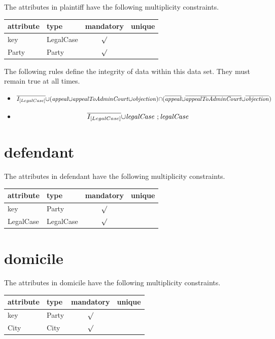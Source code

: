 \documentclass[10pt,a4paper]{report}              %
\theoremstyle{plain}\theorembodyfont{\rmfamily}\newtheorem{definition}{Definition}[section]
\theoremstyle{plain}\theorembodyfont{\rmfamily}\newtheorem{designrule}[definition]{Requirement}
\def\id#1{\mbox{\em #1\/}}
\newcommand{\cmpl}[1]{\overline{#1}}
\begin{document}
\label{sct:plug plaintiff}

The attributes in plaintiff have the following multiplicity constraints. 

\begin{center}
\begin{tabular}{llcc}
attribute & type & mandatory & unique\\
\hline
key  & LegalCase & $\surd$ & \\
Party & Party & $\surd$ & \\
\end{tabular}
\end{center}

The following rules define the integrity of data within this data set. They must remain true at all times. 

\begin{itemize}
\item
  \[\cmpl{I_{[LegalCase]}}{\cup}({\id{appeal}}{\cup}{\id{appealToAdminCourt}}{\cup}{\id{objection}}){\cap}(\cmpl{{\id{appeal}}}{\cup}\cmpl{{\id{appealToAdminCourt}}}{\cup}\cmpl{{\id{objection}}})\]
\item
  \[\cmpl{I_{[LegalCase]}}{\cup}{\id{legalCase}}~;{\id{legalCase}}\]
\end{itemize}
\section{defendant}

\label{sct:plug defendant}

The attributes in defendant have the following multiplicity constraints. 

\begin{center}
\begin{tabular}{llcc}
attribute & type & mandatory & unique\\
\hline
key  & Party & $\surd$ & \\
LegalCase & LegalCase & $\surd$ & \\
\end{tabular}
\end{center}

\section{domicile}

\label{sct:plug domicile}

The attributes in domicile have the following multiplicity constraints. 

\begin{center}
\begin{tabular}{llcc}
attribute & type & mandatory & unique\\
\hline
key  & Party & $\surd$ & \\
City & City & $\surd$ & \\
\end{tabular}
\end{center}
\end{document}
